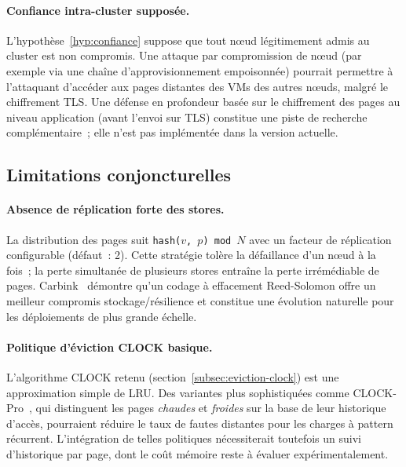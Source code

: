 \paragraph{Confiance intra-cluster supposée.}
L'hypothèse~\ref{hyp:confiance} suppose que tout nœud légitimement admis au cluster est non compromis. Une attaque par compromission de nœud (par exemple via une chaîne d'approvisionnement empoisonnée) pourrait permettre à l'attaquant d'accéder aux pages distantes des VMs des autres nœuds, malgré le chiffrement TLS. Une défense en profondeur basée sur le chiffrement des pages au niveau application (avant l'envoi sur TLS) constitue une piste de recherche complémentaire~; elle n'est pas implémentée dans la version actuelle.

\subsection{Limitations conjoncturelles}
\label{subsec:limites-conjoncturelles}

\paragraph{Absence de réplication forte des stores.}
La distribution des pages suit \texttt{hash($v$, $p$) mod $N$} avec un facteur de réplication configurable (défaut~: 2). Cette stratégie tolère la défaillance d'un nœud à la fois~; la perte simultanée de plusieurs stores entraîne la perte irrémédiable de pages. Carbink~\cite{zhou_2022_carbink} démontre qu'un codage à effacement Reed-Solomon offre un meilleur compromis stockage/résilience et constitue une évolution naturelle pour les déploiements de plus grande échelle.

\paragraph{Politique d'éviction CLOCK basique.}
L'algorithme CLOCK retenu (section~\ref{subsec:eviction-clock}) est une approximation simple de LRU. Des variantes plus sophistiquées comme CLOCK-Pro~\cite{jiang_2005_clockpro}, qui distinguent les pages \emph{chaudes} et \emph{froides} sur la base de leur historique d'accès, pourraient réduire le taux de fautes distantes pour les charges à pattern récurrent. L'intégration de telles politiques nécessiterait toutefois un suivi d'historique par page, dont le coût mémoire reste à évaluer expérimentalement.

